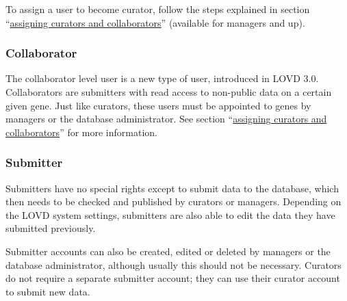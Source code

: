 \documentclass[a4paper,oneside,openany,12pt]{memoir}
\begin{document}
To assign a user to become curator, follow the steps explained in section
 ``\hyperlink{sec:gene_assign_curators}{assigning curators and collaborators}'' (available for managers and up).

\subsubsection{Collaborator}
The collaborator level user is a new type of user, introduced in LOVD 3.0.
Collaborators are submitters with read access to non-public data on a certain given gene.
Just like curators, these users must be appointed to genes by managers or the database administrator.
See section ``\hyperlink{sec:gene_assign_curators}{assigning curators and collaborators}'' for more information.

\subsubsection{Submitter}
Submitters have no special rights except to submit data to the database, which then needs to be checked and published by curators or managers.
Depending on the LOVD system settings, submitters are also able to edit the data they have submitted previously.

Submitter accounts can also be created, edited or deleted by managers or the database administrator, although usually this should not be necessary.
Curators do not require a separate submitter account; they can use their curator account to submit new data.









\end{document}
